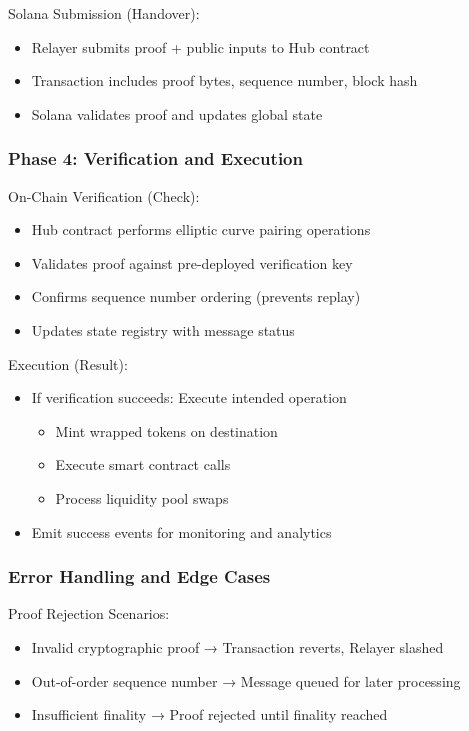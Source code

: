 \documentclass[11pt,a4paper]{article}
\begin{document}
Solana Submission (Handover):
\begin{itemize}
    \item Relayer submits proof + public inputs to Hub contract
    \item Transaction includes proof bytes, sequence number, block hash
    \item Solana validates proof and updates global state
\end{itemize}

\subsubsection*{Phase 4: Verification and Execution}

On-Chain Verification (Check):
\begin{itemize}
    \item Hub contract performs elliptic curve pairing operations
    \item Validates proof against pre-deployed verification key
    \item Confirms sequence number ordering (prevents replay)
    \item Updates state registry with message status
\end{itemize}

Execution (Result):
\begin{itemize}
    \item If verification succeeds: Execute intended operation
        \begin{itemize}
            \item Mint wrapped tokens on destination
            \item Execute smart contract calls
            \item Process liquidity pool swaps
        \end{itemize}
    \item Emit success events for monitoring and analytics
\end{itemize}

\subsubsection*{Error Handling and Edge Cases}

Proof Rejection Scenarios:
\begin{itemize}
    \item Invalid cryptographic proof → Transaction reverts, Relayer slashed
    \item Out-of-order sequence number → Message queued for later processing
    \item Insufficient finality → Proof rejected until finality reached
\end{itemize}
\end{document}
